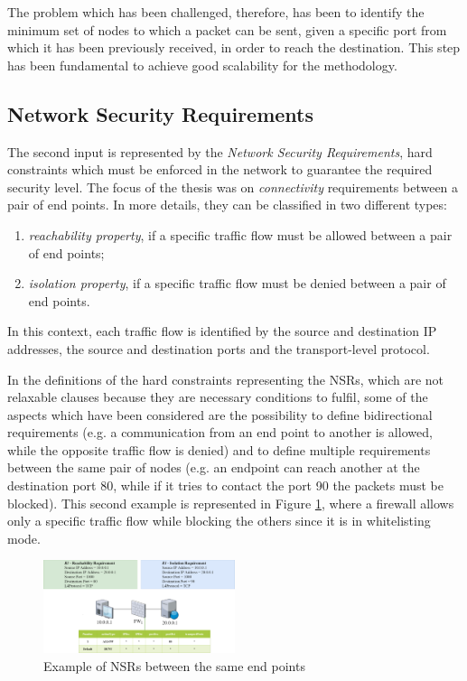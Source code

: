 \documentclass[10pt,a4paper,roman, twocolumn]{article}
\begin{document}
The problem which has been challenged, therefore, has been to identify the minimum set of nodes to which a packet can be sent, given a specific port from which it has been previously received, in order to reach the destination. This step has been fundamental to achieve good scalability for the methodology.

\subsection{Network Security Requirements}

The second input is represented by the \textit{Network Security Requirements}, hard constraints which must be enforced in the network to guarantee the required security level. The focus of the thesis was on \textit{connectivity} requirements between a pair of end points. In more details, they can be classified in two different types: 
\begin{enumerate}
\setlength\itemsep{-0.3em}
\item \textit{reachability property}, if a specific traffic flow must be allowed between a pair of end points;
\item \textit{isolation property}, if a specific traffic flow must be denied between a pair of end points.
\end{enumerate}
In this context, each traffic flow is identified by the source and destination IP addresses, the source and destination ports and the transport-level protocol.

In the definitions of the hard constraints representing the NSRs, which are not relaxable clauses because they are necessary conditions to fulfil, some of the aspects which have been considered are the possibility to define bidirectional requirements (e.g. a communication from an end point to another is allowed, while the opposite traffic flow is denied) and to define multiple requirements between the same pair of nodes (e.g. an endpoint can reach another at the destination port 80, while if it tries to contact the port 90 the packets must be blocked). This second example is represented in Figure \ref{fig:multiple03}, where a firewall allows only a specific traffic flow while blocking the others since it is in whitelisting mode.

\begin{figure}[tbh]
	\centerline{\includegraphics[width=0.5\textwidth]{images/multiple.png}}
	\caption{Example of NSRs between the same end points}
	\label{fig:multiple03}
\end{figure}
\end{document}
